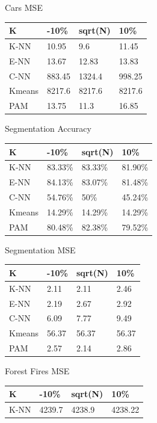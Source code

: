 \documentclass[twoside,11pt]{article}
\begin{document}
\begin{table}[ht]
\begin{minipage}[b]{0.45\linewidth}
		Cars MSE
		\centering
		\begin{tabular}{llll}
			\hline
			K      & -10\%  & sqrt(N) & 10\%   \\ \hline
			K-NN   & 10.95  & 9.6     & 11.45  \\
			E-NN   & 13.67  & 12.83   & 13.83  \\
			C-NN   & 883.45 & 1324.4  & 998.25 \\
			Kmeans & 8217.6 & 8217.6  & 8217.6 \\
			PAM    & 13.75  & 11.3    & 16.85
		\end{tabular}
	\end{minipage}
	\begin{minipage}[b]{0.45\linewidth}\centering
		Segmentation Accuracy
		\begin{tabular}{llll}
			\hline
			K      & -10\%   & sqrt(N) & 10\%    \\ \hline
			K-NN   & 83.33\% & 83.33\% & 81.90\% \\
			E-NN   & 84.13\% & 83.07\% & 81.48\% \\
			C-NN   & 54.76\% & 50\%    & 45.24\% \\
			Kmeans & 14.29\% & 14.29\% & 14.29\% \\
			PAM    & 80.48\% & 82.38\% & 79.52\%
		\end{tabular}
	\end{minipage}
	\hspace{0.5cm}
	\begin{minipage}[b]{0.45\linewidth}
		Segmentation MSE
		\centering
		\begin{tabular}{llll}
			\hline
			K      & -10\% & sqrt(N) & 10\%  \\ \hline
			K-NN   & 2.11  & 2.11    & 2.46  \\
			E-NN   & 2.19  & 2.67    & 2.92  \\
			C-NN   & 6.09  & 7.77    & 9.49  \\
			Kmeans & 56.37 & 56.37   & 56.37 \\
			PAM    & 2.57  & 2.14    & 2.86
		\end{tabular}
	\end{minipage}
	\begin{minipage}[b]{0.45\linewidth}\centering
		Forest Fires MSE
		\begin{tabular}{llll}
			\hline
			K      & -10\%   & sqrt(N) & 10\%    \\ \hline
			K-NN   & 4239.7  & 4238.9  & 4238.22 \\

\end{tabular}
\end{minipage}
\end{table}
\end{document}
